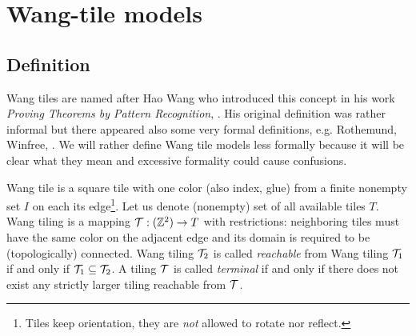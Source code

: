 \section{Wang-tile models}
\label{sec:wang}

\subsection{Definition}
	
	
	Wang tiles are named after Hao Wang who introduced this concept in his work {\em Proving Theorems by Pattern Recognition}, \cite{wang_tiles}. His original definition was rather informal but there appeared also some very formal definitions, e.g. Rothemund, Winfree, \cite{square_lb}. We will rather define Wang tile models less formally because it will be clear what they mean and excessive formality could cause confusions.
	
	Wang tile is a square tile with one color (also index, glue) from a finite nonempty set $I$ on each its edge\footnote{Tiles keep orientation, they are {\em not} allowed to rotate nor reflect.}. Let us denote (nonempty) set of all available tiles $T$. Wang tiling is a mapping ${\cal T}: (\mathbb{Z}^2) \rightarrow T$ with restrictions: neighboring tiles must have the same color on the adjacent edge and its domain is required to be (topologically) connected. Wang tiling ${\cal T}_2$ is called {\em reachable} from Wang tiling ${\cal T}_1$ if and only if ${\cal T}_1 \subseteq {\cal T}_2$. A tiling $\cal T$ is called {\em terminal} if and only if there does not exist any strictly larger tiling reachable from $\cal T$. %
	

